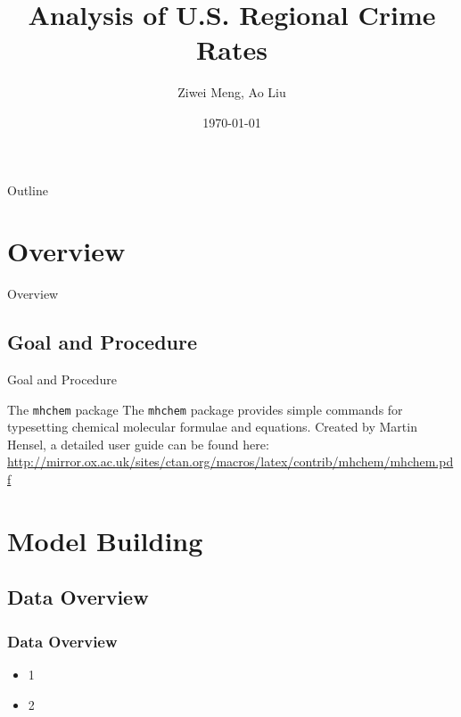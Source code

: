 \documentclass{beamer}
\title[Columbia University]{Analysis of U.S. Regional Crime Rates}
\author{Ziwei Meng, Ao Liu}
\date{\today}
\begin{document}
\begin{frame}
  \titlepage
\end{frame}

\begin{frame}{Outline}
  \tableofcontents
\end{frame}

\section{Overview}

\begin{frame}{Overview}

\end{frame}

\subsection{Goal and Procedure}
\begin{frame}{Goal and Procedure}


\begin{block}{The \texttt{mhchem} package}
The \texttt{mhchem} package provides simple commands for typesetting chemical molecular formulae and equations. Created by Martin Hensel, a detailed user guide can be found here:\\[0.4cm]
\small{\url{http://mirror.ox.ac.uk/sites/ctan.org/macros/latex/contrib/mhchem/mhchem.pdf}}
\end{block}

\end{frame}


\section{Model Building}

\subsection{Data Overview}
\begin{frame}[fragile]
\frametitle{Data Overview}

\begin{itemize}
\item 1
\item 2
\end{itemize}

\end{frame}
\end{document}
